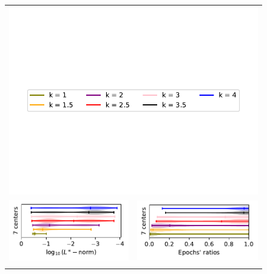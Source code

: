 \documentclass[12pt]{report} %
\begin{document}
\begin{figure}[H]
  \begin{tabular}{rl}
    \multicolumn{2}{c}{{\includegraphics[width=.7\textwidth, trim={0.5cm 4cm .5cm 3.8cm},clip=true]
          {imagenes/experiments/1d/statistical_1d_full/runge_function/runge_function_legend.pdf}}} \\ 
    {\includegraphics[width=.5\textwidth, trim={0 1.25cm 0 0},clip=true]
    {imagenes/experiments/1d/statistical_1d_full/sin_pi_x_sq/linf_sin_pi_x_sq_C7_gaussian_kernel.pdf}}  & 
    {\includegraphics[width=.44\textwidth, trim={.7cm 1.15cm 0 0},clip=true]
    {imagenes/experiments/1d/statistical_1d_full/sin_pi_x_sq/epochs_sin_pi_x_sq_C7_gaussian_kernel.pdf}}                                                                                      \\
    {\includegraphics[width=.5\textwidth, trim={0 1.25cm 0 0},clip=true]
}
\end{tabular}
\end{figure}
\end{document}
